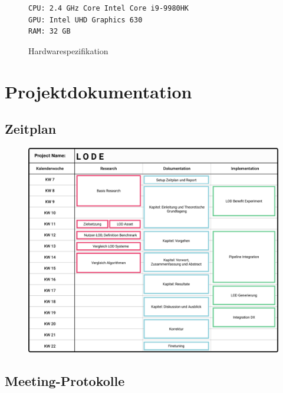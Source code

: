 \begin{figure}[H]
  \begin{lstlisting}
CPU: 2.4 GHz Core Intel Core i9-9980HK
GPU: Intel UHD Graphics 630
RAM: 32 GB
  \end{lstlisting}
\caption{Hardwarespezifikation }
\label{fig:windowsSpecification}
\end{figure}

\newpage

\section{Projektdokumentation}
\subsection{Zeitplan}
\begin{figure}[H]
  \centering
  \includegraphics[width=1\columnwidth]{../ressources/zeitplan.png}
\end{figure}

\newpage

\subsection{Meeting-Protokolle}
